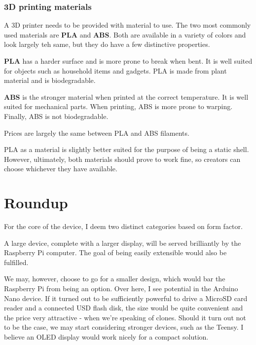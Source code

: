             \subsubsection{3D printing materials}
                A 3D printer needs to be provided with material to use.  The two most commonly used materials are \textbf{PLA} and \textbf{ABS}\cite{all3dp-best-fileament-types}.  Both are available in a variety of colors and look largely teh same, but they do have a few distinctive properties\cite{all3dp-pla-abs}. 
                
                \textbf{PLA} has a harder surface and is more prone to break when bent.  It is well suited for objects such as household items and gadgets.  PLA is made from plant material and is biodegradable.
                
                \textbf{ABS} is the stronger material when printed at the correct temperature.  It is well suited for mechanical parts.  When printing, ABS is more prone to warping.  Finally, ABS is not biodegradable.
                
                Prices are largely the same between PLA and ABS filaments.
                
                PLA as a material is slightly better suited for the purpose of being a static shell.  However, ultimately, both materials should prove to work fine, so creators can choose whichever they have available.
                
    \section{Roundup}
        For the core of the device, I deem two distinct categories based on form factor.
        
        A large device, complete with a larger display, will be served brilliantly by the Raspberry Pi computer.  The goal of being easily extensible would also be fulfilled.
        
        We may, however, choose to go for a smaller design, which would bar the Raspberry Pi from being an option.  Over here, I see potential in the Arduino Nano device.  If it turned out to be sufficiently powerful to drive a MicroSD card reader and a connected USD flash disk, the size would be quite convenient and the price very attractive - when we're speaking of clones.  Should it turn out not to be the case, we may start considering stronger devices, such as the Teensy.  I believe an OLED display would work nicely for a compact solution.
        
